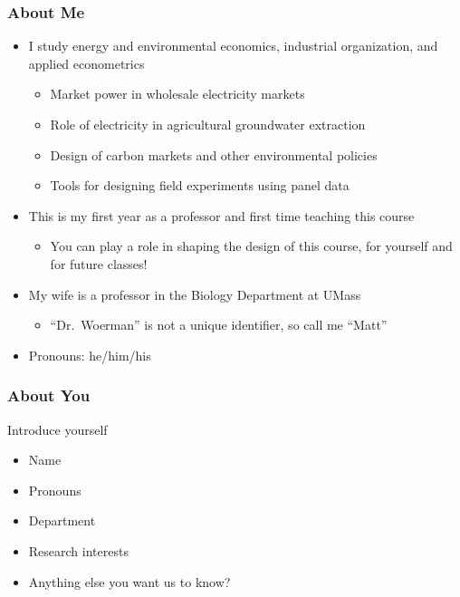 \documentclass{beamer}
\begin{document}
\begin{frame}\frametitle{About Me}
    \begin{itemize}
        \item I study energy and environmental economics, industrial organization, and applied econometrics
        \begin{itemize}
            \item Market power in wholesale electricity markets
            \item Role of electricity in agricultural groundwater extraction
            \item Design of carbon markets and other environmental policies
            \item Tools for designing field experiments using panel data
        \end{itemize}
        \item This is my first year as a professor and first time teaching this course
        \begin{itemize}
            \item You can play a role in shaping the design of this course, for yourself and for future classes!
        \end{itemize}
        \item My wife is a professor in the Biology Department at UMass
        \begin{itemize}
            \item ``Dr.\ Woerman'' is not a unique identifier, so call me ``Matt''
        \end{itemize}
        \item Pronouns: he/him/his
    \end{itemize}
\end{frame}

\begin{frame}\frametitle{About You}
    Introduce yourself
    \begin{itemize}
        \item Name
        \item Pronouns
        \item Department
        \item Research interests
        \item Anything else you want us to know?
    \end{itemize}
\end{frame}
\end{document}
